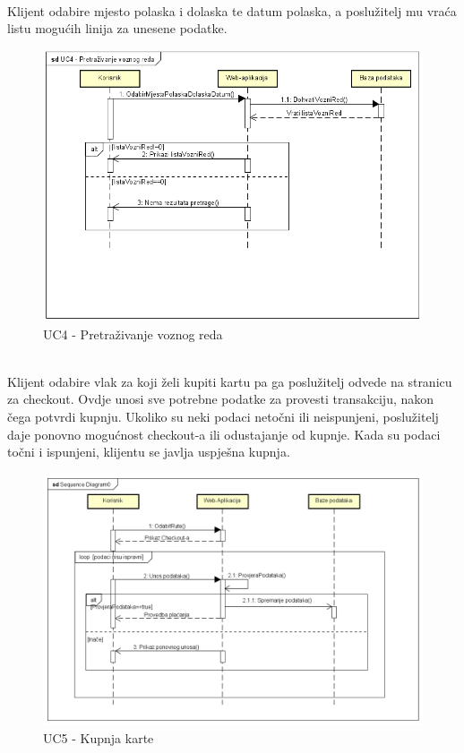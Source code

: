 				\noindent {}\\
				{Klijent odabire mjesto polaska i dolaska te datum polaska, a poslužitelj mu vraća listu mogućih linija za unesene podatke.}\\
				
				\begin{figure}[H]
					\centering
					\includegraphics[width=1\linewidth]{"slike/UC4-sekvencijski"}
					\caption{UC4 - Pretraživanje voznog reda}
					\label{fig:UC4-pregled-voznog-reda}
				\end{figure}		

				\noindent {}\\
				{Klijent odabire vlak za koji želi kupiti kartu pa ga poslužitelj odvede na stranicu za checkout. Ovdje unosi sve potrebne podatke za provesti transakciju, nakon čega potvrdi kupnju. Ukoliko su neki podaci netočni ili neispunjeni, poslužitelj daje ponovno mogućnost checkout-a ili odustajanje od kupnje. Kada su podaci točni i ispunjeni, klijentu se javlja uspješna kupnja.}\\
				
				\begin{figure}[H]
					\centering
					\includegraphics[width=1\linewidth]{"slike/UC5-sekvencijski"}
					\caption{UC5 - Kupnja karte}
					\label{fig:UC5-kupnja-karte}
				\end{figure}	

